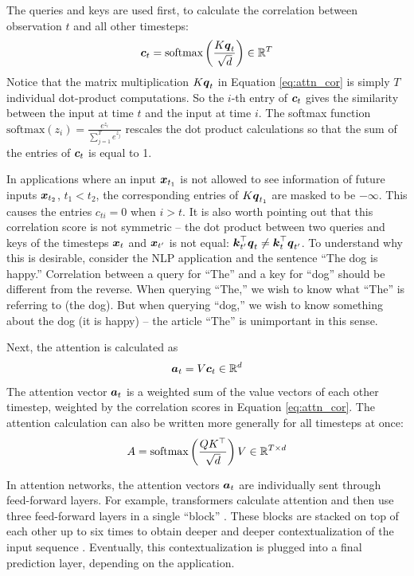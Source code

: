 The queries and keys are used first, to calculate the correlation between observation $t$ and all other timesteps:
\begin{equation}
  \boldsymbol{c}_t = \text{softmax}\left(\frac{K \boldsymbol{q}_t}{\sqrt{d}} \right) \in \mathbb{R}^T
  \label{eq:attn_cor}
\end{equation}
Notice that the matrix multiplication $K \boldsymbol{q}_t$ in Equation \ref{eq:attn_cor} is simply $T$ individual dot-product computations. So the $i$-th entry of $\boldsymbol{c}_t$ gives the similarity between the input at time $t$ and the input at time $i$. The softmax function $\text{softmax}(z_i) = \frac{e^{z_i}}{\sum_{j=1}^T e^{z_j}}$ rescales the dot product calculations so that the sum of the entries of $\boldsymbol{c}_t$ is equal to 1. 

In applications where an input $\boldsymbol{x}_{t_1}$ is not allowed to see information of future inputs $\boldsymbol{x}_{t_2}$, $t_1<t_2$, the corresponding entries of $K\boldsymbol{q}_{t_1}$ are masked to be $-\infty$. This causes the entries $c_{ti} = 0$ when $i > t$. It is also worth pointing out that this correlation score is not symmetric -- the dot product between two queries and keys of the timesteps $\boldsymbol{x}_t$ and $\boldsymbol{x}_{t'}$ is not equal: $\boldsymbol{k}_{t'}^\top \boldsymbol{q}_t \not = \boldsymbol{k}_t^\top \boldsymbol{q}_{t'}$. To understand why this is desirable, consider the NLP application and the sentence ``The dog is happy.'' Correlation between a query for ``The'' and a key for ``dog'' should be different from the reverse. When querying ``The,'' we wish to know what ``The'' is referring to (the dog). But when querying ``dog,'' we wish to know something about the dog (it is happy) -- the article ``The'' is unimportant in this sense.

Next, the attention is calculated as 
\begin{equation}
  \boldsymbol{a}_t = V \boldsymbol{c}_t \in \mathbb{R}^d
  \label{eq:attn}
\end{equation}
The attention vector $\boldsymbol{a}_t$ is a weighted sum of the value vectors of each other timestep, weighted by the correlation scores in Equation \ref{eq:attn_cor}. The attention calculation can also be written more generally for all timesteps at once:
\begin{equation}
  A = \text{softmax}\left(\frac{QK^\top}{\sqrt{d}} \right) V \in \mathbb{R}^{T \times d}
  \label{eq:attn_matrix}
\end{equation}

In attention networks, the attention vectors $\boldsymbol{a}_t$ are individually sent through feed-forward layers. For example, transformers calculate attention and then use three feed-forward layers in a single ``block'' \cite{vaswani2017}. These blocks are stacked on top of each other up to six times to obtain deeper and deeper contextualization of the input sequence \cite{dai2019}. Eventually, this contextualization is plugged into a final prediction layer, depending on the application.

